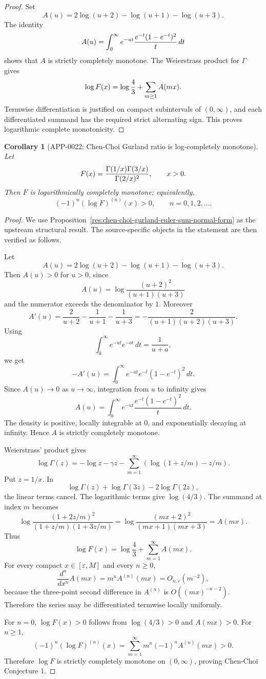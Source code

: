 \documentclass[11pt]{article}
\numberwithin{equation}{section}
\newtheorem{corollary}[theorem]{Corollary}
\theoremstyle{definition}
\theoremstyle{remark}
\newcommand{\1}{\mathbf 1}
\begin{document}
\begin{proof}
Set
\[
  A(u)=2\log(u+2)-\log(u+1)-\log(u+3).
\]
The identity
\[
 A(u)=\int_0^\infty e^{-ut}{e^{-t}(1-e^{-t})^2\over t}\,dt
\]
shows that \(A\) is strictly completely monotone.  The Weierstrass product for
\(\Gamma\) gives
\[
  \log F(x)=\log {4\over3}+\sum_{m\ge1}A(mx).
\]
Termwise differentiation is justified on compact subintervals of
\((0,\infty)\), and each differentiated summand has the required strict
alternating sign.  This proves logarithmic complete monotonicity.
\end{proof}

\begin{corollary}[APP-0022: Chen-Choi Gurland ratio is log-completely monotone]
\label{thm:app22-gurland-logcm}
Let
\[
  F(x)={\Gamma(1/x)\Gamma(3/x)\over \Gamma(2/x)^2},\qquad x>0.
\]
Then \(F\) is logarithmically completely monotone; equivalently,
\[
  (-1)^n(\log F)^{(n)}(x)>0,\qquad n=0,1,2,\ldots .
\]


\end{corollary}

\begin{proof}
We use Proposition~\ref{res:chen-choi-gurland-euler-sum-normal-form} as the upstream structural result. The source-specific objects in the statement are then verified as follows.

Let
\[
A(u)=2\log(u+2)-\log(u+1)-\log(u+3).
\]
Then \(A(u)>0\) for \(u>0\), since
\[
A(u)=\log\frac{(u+2)^2}{(u+1)(u+3)}
\]
and the numerator exceeds the denominator by \(1\).
Moreover
\[
A'(u)=\frac2{u+2}-\frac1{u+1}-\frac1{u+3}
=-\frac{2}{(u+1)(u+2)(u+3)}.
\]
Using
\[
\int_0^\infty e^{-ut}e^{-at}\,dt=\frac1{u+a},
\]
we get
\[
-A'(u)=\int_0^\infty e^{-ut}e^{-t}(1-e^{-t})^2\,dt.
\]
Since \(A(u)\to0\) as \(u\to\infty\), integration from \(u\) to infinity gives
\[
A(u)=\int_0^\infty e^{-ut}\frac{e^{-t}(1-e^{-t})^2}{t}\,dt.
\]
The density is positive, locally integrable at \(0\), and exponentially decaying at infinity. Hence \(A\) is strictly completely monotone.

Weierstrass' product gives
\[
\log\Gamma(z)=-\log z-\gamma z-
\sum_{m=1}^{\infty}\left(\log(1+z/m)-z/m\right).
\]
Put \(z=1/x\). In
\[
\log\Gamma(z)+\log\Gamma(3z)-2\log\Gamma(2z),
\]
the linear terms cancel. The logarithmic terms give \(\log(4/3)\). The summand at index \(m\) becomes
\[
\log\frac{(1+2z/m)^2}{(1+z/m)(1+3z/m)}
=\log\frac{(mx+2)^2}{(mx+1)(mx+3)}=A(mx).
\]
Thus
\[
\log F(x)=\log\frac43+\sum_{m=1}^{\infty}A(mx).
\]
For every compact \(x\in[\varepsilon,M]\) and every \(n\ge0\),
\[
\frac{d^n}{dx^n}A(mx)=m^nA^{(n)}(mx)=O_{n,\varepsilon}(m^{-2}),
\]
because the three-point second difference in \(A^{(n)}\) is \(O((mx)^{-n-2})\). Therefore the series may be differentiated termwise locally uniformly.

For \(n=0\), \(\log F(x)>0\) follows from \(\log(4/3)>0\) and \(A(mx)>0\). For \(n\ge1\),
\[
(-1)^n(\log F)^{(n)}(x)=
\sum_{m=1}^{\infty}m^n(-1)^nA^{(n)}(mx)>0.
\]
Therefore \(\log F\) is strictly completely monotone on \((0,\infty)\), proving Chen-Choi Conjecture 1.
\end{proof}
\end{document}
